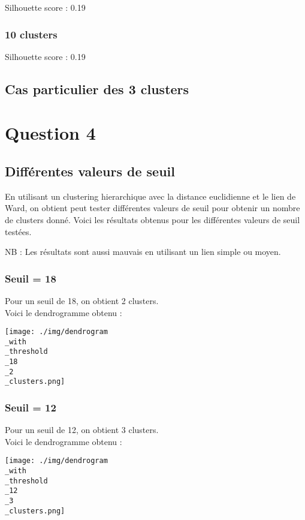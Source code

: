 \documentclass{article}
\begin{document}
Silhouette score : 0.19

\subsubsection*{10 clusters}

Silhouette score : 0.19

\subsection*{Cas particulier des 3 clusters}


\section*{Question 4}

\subsection*{Différentes valeurs de seuil}

En utilisant un clustering hierarchique avec la distance euclidienne et 
le lien de Ward, on obtient peut tester différentes valeurs de seuil pour
obtenir un nombre de clusters donné. Voici les résultats obtenus pour les
différentes valeurs de seuil testées.

NB : Les résultats sont aussi mauvais en utilisant un lien simple ou
moyen.

\subsubsection*{Seuil = 18}
Pour un seuil de 18, on obtient 2 clusters.\\
Voici le dendrogramme obtenu :

\begin{center}
    \texttt{[image: ./img/dendrogram\\\_with\\\_threshold\\\_18\\\_2\\\_clusters.png]}
\end{center}

\subsubsection*{Seuil = 12}
Pour un seuil de 12, on obtient 3 clusters.\\
Voici le dendrogramme obtenu :

\begin{center}
    \texttt{[image: ./img/dendrogram\\\_with\\\_threshold\\\_12\\\_3\\\_clusters.png]}
\end{center}
\end{document}

